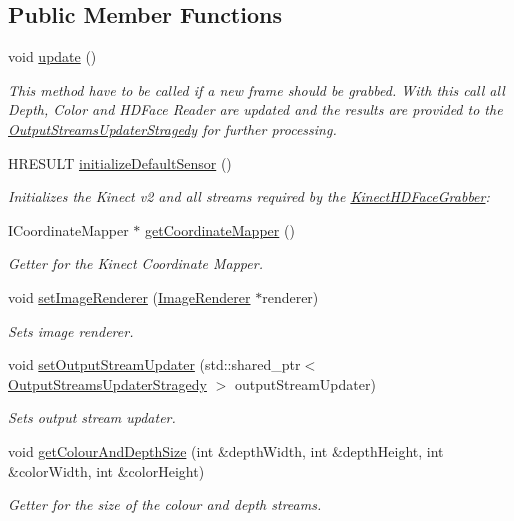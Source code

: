 \subsection*{Public Member Functions}
\begin{DoxyCompactItemize}
\item 
\hypertarget{class_kinect_h_d_face_grabber_a619b994aaca778dd7d8ce180b59a6667}{}void \hyperlink{class_kinect_h_d_face_grabber_a619b994aaca778dd7d8ce180b59a6667}{update} ()\label{class_kinect_h_d_face_grabber_a619b994aaca778dd7d8ce180b59a6667}

\begin{DoxyCompactList}\small\item\em This method have to be called if a new frame should be grabbed. With this call all Depth, Color and H\+D\+Face Reader are updated and the results are provided to the \hyperlink{class_output_streams_updater_stragedy}{Output\+Streams\+Updater\+Stragedy} for further processing. \end{DoxyCompactList}\item 
H\+R\+E\+S\+U\+L\+T \hyperlink{class_kinect_h_d_face_grabber_ae9f90e10fe776a244cd7addfd0eaac9d}{initialize\+Default\+Sensor} ()
\begin{DoxyCompactList}\small\item\em Initializes the Kinect v2 and all streams required by the \hyperlink{class_kinect_h_d_face_grabber}{Kinect\+H\+D\+Face\+Grabber}\+: \end{DoxyCompactList}\item 
I\+Coordinate\+Mapper $\ast$ \hyperlink{class_kinect_h_d_face_grabber_a3f0c83ad5721a4fb7ff4da043c21dc98}{get\+Coordinate\+Mapper} ()
\begin{DoxyCompactList}\small\item\em Getter for the Kinect Coordinate Mapper. \end{DoxyCompactList}\item 
void \hyperlink{class_kinect_h_d_face_grabber_a4a3b537dfc25c558d6f219b519ce2166}{set\+Image\+Renderer} (\hyperlink{class_image_renderer}{Image\+Renderer} $\ast$renderer)
\begin{DoxyCompactList}\small\item\em Sets image renderer. \end{DoxyCompactList}\item 
void \hyperlink{class_kinect_h_d_face_grabber_a12915266d3fe68e3a068d82d67342b90}{set\+Output\+Stream\+Updater} (std\+::shared\+\_\+ptr$<$ \hyperlink{class_output_streams_updater_stragedy}{Output\+Streams\+Updater\+Stragedy} $>$ output\+Stream\+Updater)
\begin{DoxyCompactList}\small\item\em Sets output stream updater. \end{DoxyCompactList}\item 
void \hyperlink{class_kinect_h_d_face_grabber_a8a32363822034f5d3bac76b62f1ef809}{get\+Colour\+And\+Depth\+Size} (int \&depth\+Width, int \&depth\+Height, int \&color\+Width, int \&color\+Height)
\begin{DoxyCompactList}\small\item\em Getter for the size of the colour and depth streams. \end{DoxyCompactList}\end{DoxyCompactItemize}
